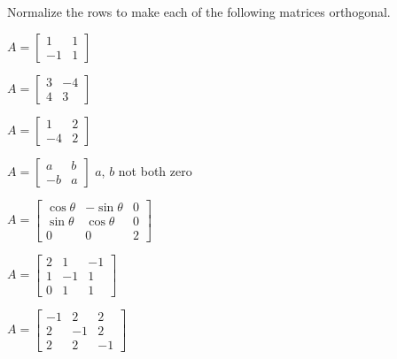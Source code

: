 \documentclass{ximera}
\begin{document}
\begin{problem}\label{prob:make_ortho_matrix}
Normalize the rows to make each of the following matrices orthogonal.

% 
\begin{problem}\label{prob:make_ortho_matrix1} 
$A = \begin{bmatrix}
1 & 1 \\
-1 & 1
\end{bmatrix}$
\end{problem}
\begin{problem} 
$A = \begin{bmatrix}
3 & -4 \\
4 & 3
\end{bmatrix}$
\end{problem}

\begin{problem}\label{prob:make_ortho_matrix2}
$A = \begin{bmatrix}
1 & 2 \\
-4 & 2
\end{bmatrix}$
\end{problem}

\begin{problem}\label{prob:make_ortho_matrix3}
$A = \begin{bmatrix}
a & b \\
-b & a
\end{bmatrix}$ \quad $a$, $b$ not both zero
\end{problem}
\begin{problem}
$A = \begin{bmatrix}
\cos\theta & -\sin\theta & 0 \\
\sin\theta & \cos\theta & 0 \\
0 & 0 & 2
\end{bmatrix}$
\end{problem}

\begin{problem}\label{prob:make_ortho_matrix4}
$A = \begin{bmatrix}
2 & 1 & -1 \\
1 & -1 & 1 \\
0 & 1 & 1
\end{bmatrix}$
\end{problem}

\begin{problem}\label{prob:make_ortho_matrix5}
$A = \begin{bmatrix}
-1 & 2 & 2 \\
2 & -1 & 2 \\
2 & 2 & -1
\end{bmatrix}$
\end{problem}


\end{problem}
\end{document}
